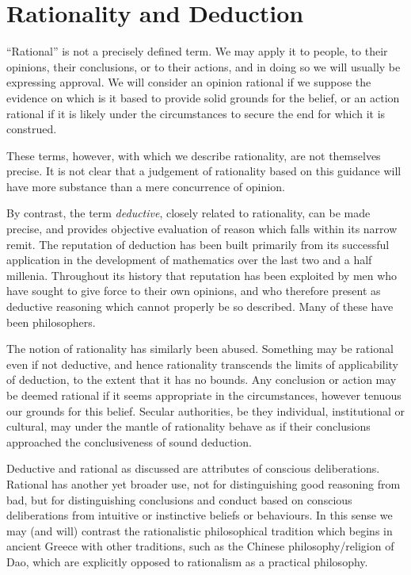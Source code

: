 \def\rbjidchaab{$$Id: ch001.tex,v 1.3 2010/02/06 16:19:48 rbj Exp $$}

\chapter{Rationality and Deduction}\label{RationalityDeduction}

``Rational'' is not a precisely defined term.
We may apply it to people, to their opinions, their conclusions, or to their actions, and in doing so we will usually be expressing approval.
We will consider an opinion rational if we suppose the evidence on which is it based to provide solid grounds for the belief, or an action rational if it is likely under the circumstances to secure the end for which it is construed.

These terms, however, with which we describe rationality, are not themselves precise.
It is not clear that a judgement of rationality based on this guidance will have more substance than a mere concurrence of opinion.

By contrast, the term {\it deductive}, closely related to rationality, can be made precise, and provides objective evaluation of reason which falls within its narrow remit.
The reputation of deduction has been built primarily from its successful application in the development of mathematics over the last two and a half millenia.
Throughout its history that reputation has been exploited by men who have sought to give force to their own opinions, and who therefore present as deductive reasoning which cannot properly be so described.
Many of these have been philosophers.

The notion of rationality has similarly been abused.
Something may be rational even if not deductive, and hence rationality transcends the limits of applicability of deduction, to the extent that it has no bounds.
Any conclusion or action may be deemed rational if it seems appropriate in the circumstances, however tenuous our grounds for this belief.
Secular authorities, be they individual, institutional or cultural, may under the mantle of rationality behave as if their conclusions approached the conclusiveness of sound deduction.

Deductive and rational as discussed are attributes of conscious deliberations.
Rational has another yet broader use, not for distinguishing good reasoning from bad, but for distinguishing conclusions and conduct based on conscious deliberations from intuitive or instinctive beliefs or behaviours.
In this sense we may (and will) contrast the rationalistic philosophical tradition which begins in ancient Greece with other traditions, such as the Chinese philosophy/religion of Dao, which are explicitly opposed to rationalism as a practical philosophy.

